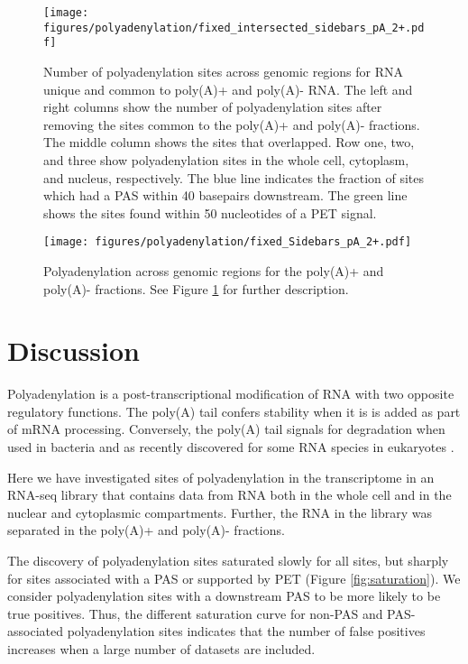\begin{figure}[hb]
	\begin{center}
		\texttt{[image: figures/polyadenylation/fixed\_intersected\_sidebars\_pA\_2+.pdf]}
	\end{center}
	\caption{Number of polyadenylation sites across genomic regions for RNA
	unique and common to poly(A)+ and poly(A)- RNA. The left and right columns
	show the number of polyadenylation sites after removing the sites common to
	the poly(A)+ and poly(A)- fractions. The middle column shows the sites that
	overlapped. Row one, two, and three show polyadenylation sites in the whole
	cell, cytoplasm, and nucleus, respectively. The blue line indicates the
	fraction of sites which had a PAS within 40 basepairs downstream. The green
	line shows the sites found within 50 nucleotides of a PET signal.}
	\label{fig:sidebars_intersect}
\end{figure}

\begin{figure}[hb]
	\begin{center}
		\texttt{[image: figures/polyadenylation/fixed\_Sidebars\_pA\_2+.pdf]}
	\end{center}
	\caption{Polyadenylation across genomic regions for the poly(A)+ and poly(A)-
	fractions. See Figure \ref{fig:sidebars_intersect} for further description.}
	\label{fig:sidebars}
\end{figure}

\section{Discussion}
Polyadenylation is a post-transcriptional modification of RNA with two opposite
regulatory functions. The poly(A) tail confers stability when it is is added as
part of mRNA processing. Conversely, the poly(A) tail signals for degradation
when used in bacteria and as recently discovered for some RNA species in
eukaryotes \cite{shcherbik_polyadenylation_2010}.

Here we have investigated sites of polyadenylation in the transcriptome in an
RNA-seq library that contains data from RNA both in the whole cell and in the
nuclear and cytoplasmic compartments. Further, the RNA in the library was
separated in the poly(A)+ and poly(A)- fractions.

The discovery of polyadenylation sites saturated slowly for all sites, but
sharply for sites associated with a PAS or supported by PET (Figure
\ref{fig:saturation}). We consider polyadenylation sites with a downstream PAS
to be more likely to be true positives. Thus, the different saturation curve
for non-PAS and PAS-associated polyadenylation sites indicates that the number
of false positives increases when a large number of datasets are included.

